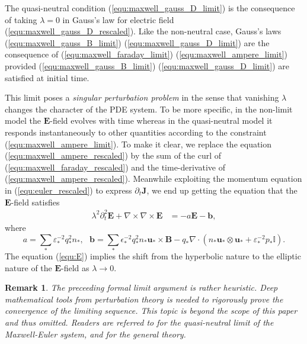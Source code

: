 \documentclass{article}
\newtheorem*{remark}{Remark}
\begin{document}
The quasi-neutral condition (\ref{equ:maxwell_gauss_D_limit}) is the consequence of taking $\lambda = 0$ in Gauss's law for electric field (\ref{equ:maxwell_gauss_D_rescaled}). Like the non-neutral case, Gauss's laws (\ref{equ:maxwell_gauss_B_limit}) (\ref{equ:maxwell_gauss_D_limit}) are the consequence of (\ref{equ:maxwell_faraday_limit}) (\ref{equ:maxwell_ampere_limit}) provided (\ref{equ:maxwell_gauss_B_limit}) (\ref{equ:maxwell_gauss_D_limit}) are satisfied at initial time. 


This limit poses a \emph{singular perturbation problem} in the sense that vanishing $\lambda$ changes the character of the PDE system. To be more specific, in the non-limit model the $\mathbf{E}$-field evolves with time whereas in the quasi-neutral model it responds instantaneously to other quantities according to the constraint (\ref{equ:maxwell_ampere_limit}). To make it clear, we replace the equation (\ref{equ:maxwell_ampere_rescaled}) by the sum of the curl of (\ref{equ:maxwell_faraday_rescaled}) and the time-derivative of (\ref{equ:maxwell_ampere_rescaled}). Meanwhile exploiting the momentum equation in (\ref{equ:euler_rescaled}) to express $\partial_t\mathbf{J}$, we end up getting the equation that the $\mathbf{E}$-field satisfies
\begin{align}
    \lambda^2\partial_t^2 \mathbf{E} + \nabla \times \nabla \times \mathbf{E} &= - a\mathbf{E} - \mathbf{b}, \label{equ:E}
\end{align}
where
\begin{equation*}
    a = \sum_*\varepsilon_*^{-2}q_*^2n_*, \ \ \ \mathbf{b} = \sum_* \epsilon_*^{-2}q_*^2n_*\mathbf{u}_*\times\mathbf{B} - q_*\nabla\cdot(n_* \mathbf{u}_* \otimes \mathbf{u}_* + \varepsilon_*^{-2}p_*\mathbb{I}).
\end{equation*}
 The equation (\ref{equ:E}) implies the shift from the hyperbolic nature to the elliptic nature of the $\mathbf{E}$-field as $\lambda\rightarrow0$. 

\begin{remark}
    The preceeding formal limit argument is rather heuristic. Deep mathematical tools from perturbation theory is needed to rigorously prove the convergence of the limiting sequence. This topic is beyond the scope of this paper and thus omitted. Readers are referred to \cite[ch. 2]{remi_2014} \cite{Peng_2008} for the quasi-neutral limit of the Maxwell-Euler system, and \cite{mark_1995, Eckhaus_1980} for the general theory.
\end{remark} 
\end{document}
